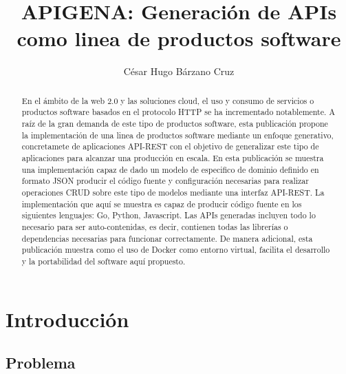 \documentclass{svproc}
\begin{document}


\mainmatter             


\title{APIGENA: Generación de APIs como linea de productos software}

\author{César Hugo Bárzano Cruz }

\maketitle              %

\begin{abstract}

En el ámbito de la web 2.0 y las soluciones cloud,  el uso y consumo de servicios o productos software basados en el protocolo HTTP se ha incrementado notablemente. A raíz de la gran demanda de este tipo de productos software, esta publicación propone la implementación  de una linea de productos software mediante un enfoque generativo, concretamete  de aplicaciones  API-REST con el objetivo de generalizar este tipo de aplicaciones para alcanzar una producción en escala. En esta publicación se muestra una implementación  capaz de dado un modelo de especifico de dominio definido en formato JSON producir el código fuente y configuración necesarias para realizar operaciones CRUD sobre este tipo de modelos mediante una interfaz API-REST.  La implementación que aquí se muestra es capaz de producir código fuente en los siguientes lenguajes: Go, Python, Javascript. Las APIs generadas incluyen todo lo necesario para ser auto-contenidas, es decir, contienen todas las librerías o dependencias necesarias para funcionar correctamente. De manera adicional, esta publicación muestra como el uso de Docker como entorno virtual,  facilita el desarrollo y la portabilidad del software aquí propuesto.  


\end{abstract}

\section{Introducción}

\subsection{Problema}
\end{document}
